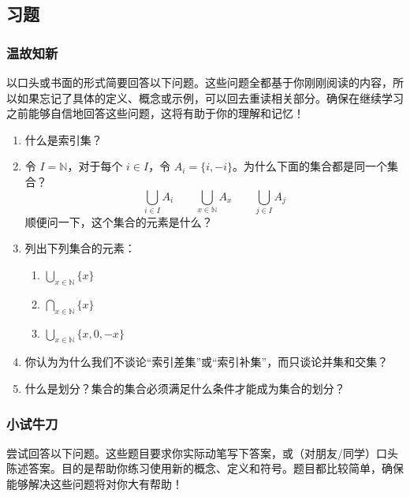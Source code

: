 \subsection{习题}

\subsubsection*{温故知新}

以口头或书面的形式简要回答以下问题。这些问题全都基于你刚刚阅读的内容，所以如果忘记了具体的定义、概念或示例，可以回去重读相关部分。确保在继续学习之前能够自信地回答这些问题，这将有助于你的理解和记忆！

\begin{enumerate}[label=(\arabic*)]
    \item 什么是索引集？
    \item 令 $I = \mathbb{N}$，对于每个 $i \in I$，令 $A_i = \{i, -i\}$。为什么下面的集合都是同一个集合？
    \[\bigcup_{i \in I} A_i \qquad \bigcup_{x \in \mathbb{N}} A_x \qquad \bigcup_{j \in I} A_j\]
    顺便问一下，这个集合的元素是什么？
    \item 列出下列集合的元素：
    \begin{enumerate}[label=(\alph*)]
        \item $\displaystyle{\bigcup_{x \in \mathbb{N}}\{x\}}$
        \item $\displaystyle{\bigcap_{x \in \mathbb{N}}\{x\}}$
        \item $\displaystyle{\bigcup_{x \in \mathbb{N}}\{x,0,-x\}}$
    \end{enumerate}
    \item 你认为为什么我们不谈论``索引差集''或``索引补集''，而只谈论并集和交集？
    \item 什么是划分？集合的集合必须满足什么条件才能成为集合的划分？
\end{enumerate}

\subsubsection*{小试牛刀}

尝试回答以下问题。这些题目要求你实际动笔写下答案，或（对朋友/同学）口头陈述答案。目的是帮助你练习使用新的概念、定义和符号。题目都比较简单，确保能够解决这些问题将对你大有帮助！

